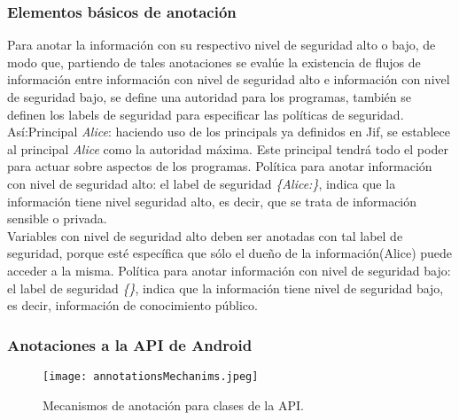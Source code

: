 \subsubsection{Elementos básicos de anotación}
Para anotar la información con su respectivo nivel de seguridad alto o bajo, de
modo que, partiendo de tales anotaciones se evalúe la existencia de flujos de
información entre información con nivel de seguridad alto e información con
nivel de seguridad bajo, se define una autoridad para los programas, también se
definen los labels de seguridad para especificar las políticas de seguridad.
Así:\newline Principal \emph{Alice}: haciendo uso de los principals ya definidos en Jif, se
establece al principal \emph{Alice} como la autoridad máxima. Este principal
tendrá todo el poder para actuar sobre aspectos de los programas.\newline
Política para anotar información con nivel de seguridad alto: el label de
seguridad \emph{\{Alice:\}},  indica que la información tiene nivel seguridad
alto, es decir, que se trata de información sensible o privada.\\
Variables con nivel de seguridad alto deben ser anotadas con tal label de
seguridad, porque esté específica que sólo el dueño de la información(Alice)
puede acceder a la misma.\newline 
Política para anotar información con nivel de seguridad bajo: el label de
seguridad \emph{\{\}}, indica que la información tiene nivel de seguridad bajo,
es decir, información de conocimiento público.\newline


\subsubsection{Anotaciones a la API de Android}
\label{subsec:api}

\begin{figure}[t!]
	\begin{center}
	\texttt{[image: annotationsMechanims.jpeg]}
	\end{center}
	\caption{Mecanismos de anotación para clases de la API.}
	\label{fig:annotationsMechanims}  
\end{figure}

